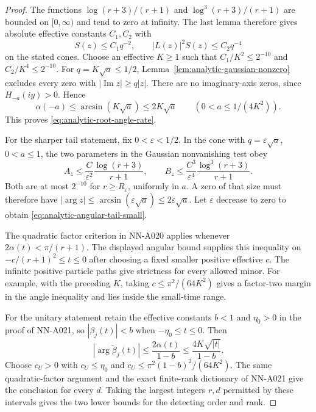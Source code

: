 \begin{proof}
The functions
$\log(r+3)/(r+1)$ and $\log^3(r+3)/(r+1)$ are bounded on
$[0,\infty)$ and tend to zero at infinity. The last lemma
therefore gives absolute effective constants $C_1,C_2$ with
\[
                  S(z)\le C_1q^{-2},\qquad
                  |L(z)|^2S(z)\le C_2q^{-4}
\]
on the stated cones. Choose an effective $K\ge1$ such that
$C_1/K^2\le2^{-10}$ and $C_2/K^4\le2^{-10}$.
For $q=K\sqrt a\le1/2$, Lemma~\ref{lem:analytic-gaussian-nonzero}
excludes every zero with $|\operatorname{Im}z|\ge q|z|$.
There are no imaginary-axis zeros, since $H_{-a}(iy)>0$.
Hence
\[
                 \alpha(-a)\le\arcsin(K\sqrt a)\le2K\sqrt a
                    \qquad(0<a\le1/(4K^2)).
\]
This proves \eqref{eq:analytic-root-angle-rate}.

For the sharper tail statement, fix $0<\varepsilon<1/2$.
In the cone with $q=\varepsilon\sqrt a$, $0<a\le1$, the
two parameters in the Gaussian nonvanishing test obey
\[
 A_z\le\frac C{\varepsilon^2}
               \frac{\log(r+3)}{r+1},\qquad
 B_z\le\frac{C^3}{\varepsilon^4}
               \frac{\log^3(r+3)}{r+1}.
\]
Both are at most $2^{-10}$ for $r\ge R_\varepsilon$,
uniformly in $a$. A zero of that size must therefore have
$|\arg z|\le\arcsin(\varepsilon\sqrt a)
\le2\varepsilon\sqrt a$. Let $\varepsilon$ decrease to zero
to obtain \eqref{eq:analytic-angular-tail-small}.

The quadratic factor criterion in NN-A020 applies whenever
$2\alpha(t)<\pi/(r+1)$. The displayed angular bound supplies
this inequality on $-c/(r+1)^2\le t\le0$ after choosing a
fixed smaller positive effective $c$. The infinite positive
particle paths give strictness for every allowed minor.
For example, with the preceding $K$, taking
$c\le\pi^2/(64K^2)$ gives a factor-two margin in the angle
inequality and lies inside the small-time range.

For the unitary statement retain the effective constants
$b<1$ and $\eta_0>0$ in the proof of NN-A021, so
$|\beta_j(t)|<b$ when $-\eta_0\le t\le0$. Then
\[
          |\arg\widetilde\beta_j(t)|
               \le\frac{2\alpha(t)}{1-b}
               \le\frac{4K\sqrt{|t|}}{1-b}.
\]
Choose $c_U>0$ with $c_U\le\eta_0$ and
$c_U\le\pi^2(1-b)^2/(64K^2)$. The same quadratic-factor
argument and the exact finite-rank dictionary of NN-A021
give the conclusion for every $d$. Taking the largest
integers $r,d$ permitted by these intervals gives the two
lower bounds for the detecting order and rank.
\end{proof}

